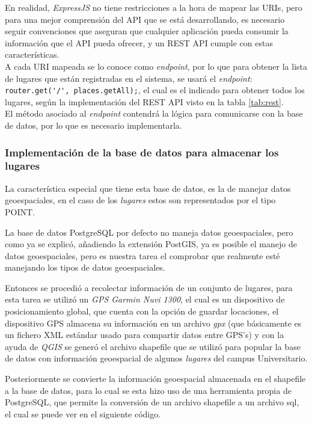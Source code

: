 En realidad, \emph{ExpressJS} no tiene restricciones a la hora de mapear las URIs, pero para una mejor comprensión del API que se está desarrollando, es necesario seguir convenciones que aseguran que cualquier aplicación pueda consumir la información que el API pueda ofrecer, y un REST API cumple con estas características. \\

A cada URI mapeada se lo conoce como \emph{endpoint}, por lo que para obtener la lista de lugares que están registradas en el sistema, se usará el \emph{endpoint}: \verb|router.get('/', places.getAll);|, el cual es el indicado para obtener todos los lugares, según la implementación del REST API visto en la tabla \ref{tab:rest}. \\

El método asociado al \emph{endpoint} contendrá la lógica para comunicarse con la base de datos, por lo que es necesario implementarla. \\


\subsubsection{Implementación de la base de datos para almacenar los lugares}

La característica especial que tiene esta base de datos, es la de manejar datos geoespaciales, en el caso de los \emph{lugares} estos son representados por el tipo POINT.

La base de datos PostgreSQL por defecto no maneja datos geoespaciales, pero como ya se explicó, añadiendo la extensión PostGIS, ya es posible el manejo de datos geoespaciales, pero es nuestra tarea el comprobar que realmente esté manejando los tipos de datos geoespaciales.

Entonces se procedió a recolectar información de un conjunto de lugares, para esta tarea se utilizó un \emph{GPS Garmin Nuvi 1300}, el cual es un dispositivo de posicionamiento global, que cuenta con la opción de guardar locaciones, el dispositivo GPS almacena su información en un archivo \emph{gpx} (que básicamente es un fichero XML estándar usado para compartir datos entre GPS's) y con la ayuda de \emph{QGIS} se gener\'o el archivo shapefile que se utilizó para popular la base de datos con información geoespacial de algunos \emph{lugares} del campus Universitario.

Posteriormente se convierte la información geoespacial almacenada en el shapefile a la base de datos, para lo cual se esta hizo uso de una herramienta propia de PostgreSQL, que permite la conversión de un archivo shapefile a un archivo sql, el cual se puede ver en el siguiente código.

